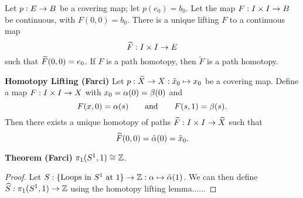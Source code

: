 \vs

\begin{lem}
Let $p: E \rightarrow B$ be a covering map; let $p(e_0) = b_0$. Let the map $F: I \times I \rightarrow B$ be continuous, with $F(0,0) = b_0$. There is a unique lifting $F$ to a continuous map
\[\widetilde F: I\times I \rightarrow E\]
such that $\widetilde F(0,0) = e_0$. If $F$ is a path homotopy, then $\tilde F$ is a path homotopy.
\end{lem}

\vs

\textbf{Homotopy Lifting (Farci)} Let $p: \widetilde X \rightarrow X:\tilde x_0 \mapsto x_0$ be a covering map. Define a map $F: I \times I \rightarrow X$ with $x_0 = \alpha(0) = \beta(0)$ and
\[F(x, 0) = \alpha(s) \qquad\text{and}\qquad F(s, 1) = \beta(s).\]
Then there exists a unique homotopy of paths $\widetilde F: I\times I \rightarrow \widetilde X$ such that
\[\widetilde F(0,0) = \tilde{\alpha}(0) = \tilde x_0.\]



\vs


\textbf{Theorem (Farci)} $\pi_1(S^1, 1) \cong \mathbb{Z}$.

\begin{proof}
Let $S: \{\text{Loops in $S^1$ at 1} \}\rightarrow \mathbb{Z}:\alpha \mapsto \tilde {\alpha}(1)$. We can then define $\widehat S: \pi_1 (S^1, 1) \rightarrow \mathbb{Z}$ using the homotopy lifting lemma......
\end{proof}













